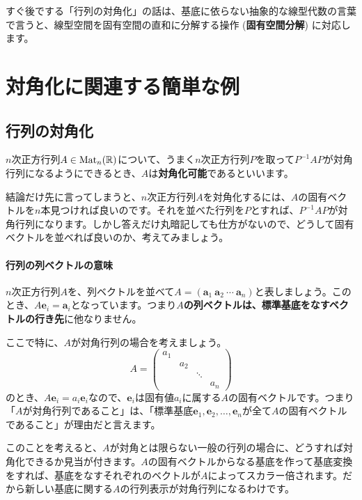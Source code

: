 すぐ後でする「行列の対角化」の話は、基底に依らない抽象的な線型代数の言葉で言うと、線型空間を固有空間の直和に分解する操作 (\textbf{固有空間分解}) に対応します。

\section{対角化に関連する簡単な例}

\subsection{行列の対角化}

$n$次正方行列$A \in \operatorname{Mat}_n(\mathbb{R})$について、うまく$n$次正方行列$P$を取って$P^{-1} A P$が対角行列になるようにできるとき、$A$は\textbf{対角化可能}であるといいます。

結論だけ先に言ってしまうと、$n$次正方行列$A$を対角化するには、$A$の固有ベクトルを$n$本見つければ良いのです。それを並べた行列を$P$とすれば、$P^{-1} A P$が対角行列になります。しかし答えだけ丸暗記しても仕方がないので、どうして固有ベクトルを並べれば良いのか、考えてみましょう。

\paragraph{行列の列ベクトルの意味}

$n$次正方行列$A$を、列ベクトルを並べて$A = (\bm{a}_1 \ \bm{a}_2 \ \cdots \ \bm{a}_n)$と表しましょう。このとき、$A\bm{e}_i = \bm{a}_i$となっています。つまり\textbf{$A$の列ベクトルは、標準基底をなすベクトルの行き先}に他なりません。

ここで特に、$A$が対角行列の場合を考えましょう。
\[
A =
\begin{pmatrix}
a_1 \\
& a_2 \\
& & \ddots \\
& & & a_n
\end{pmatrix}
\]
のとき、$A\bm{e}_i = a_i \bm{e}_i$なので、$\bm{e}_i$は固有値$a_i$に属する$A$の固有ベクトルです。つまり「$A$が対角行列であること」は、「標準基底$\bm{e}_1, \bm{e}_2, \ldots, \bm{e}_n$が全て$A$の固有ベクトルであること」が理由だと言えます。

このことを考えると、$A$が対角とは限らない一般の行列の場合に、どうすれば対角化できるか見当が付きます。$A$の固有ベクトルからなる基底を作って基底変換をすれば、基底をなすそれぞれのベクトルが$A$によってスカラー倍されます。だから新しい基底に関する$A$の行列表示が対角行列になるわけです。

